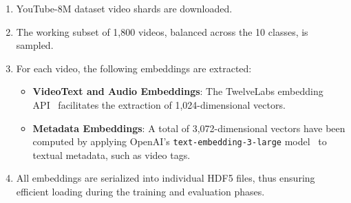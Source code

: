 
\begin{enumerate}
    \item YouTube-8M dataset video shards are downloaded.
    \item The working subset of 1,800 videos, balanced across the 10 classes, is sampled.
    \item For each video, the following embeddings are extracted:
    \begin{itemize}
        \item \textbf{Video\-Text and Audio Embeddings}: The TwelveLabs embedding API~\cite{lee2024twlv, twelvelabs_embed_api_doc} facilitates the extraction of 1,024-dimensional vectors.
        \item \textbf{Metadata Embeddings}: A total of 3,072-dimensional vectors have been computed by applying OpenAI's \texttt{text-embedding-3-large} model~\cite{openai_text_embedding_3_large} to textual metadata, such as video tags.
    \end{itemize}
    \item All embeddings are serialized into individual HDF5 files, thus ensuring efficient loading during the training and evaluation phases.
\end{enumerate}

